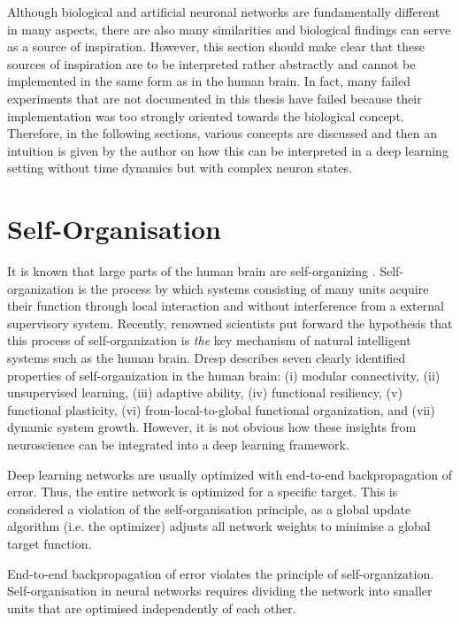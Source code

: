 Although biological and artificial neuronal networks are fundamentally different in many aspects, there are also many similarities and biological findings can serve as a source of inspiration. However, this section should make clear that these sources of inspiration are to be interpreted rather abstractly and cannot be implemented in the same form as in the human brain. In fact, many failed experiments that are not documented in this thesis have failed because their implementation was too strongly oriented towards the biological concept. Therefore, in the following sections, various concepts are discussed and then an intuition is given by the author on how this can be interpreted in a deep learning setting without time dynamics but with complex neuron states.


\section{Self-Organisation}
It is known that large parts of the human brain are self-organizing .
Self-organization is the process by which systems consisting of many units acquire their function through local interaction and without interference from a external supervisory system.
Recently, renowned scientists  put forward the hypothesis that this process of self-organization is \emph{the} key mechanism of natural intelligent systems such as the human brain.
Dresp  describes seven clearly identified properties of self-organization in the human brain: (i) modular connectivity, (ii) unsupervised learning, (iii) adaptive ability, (iv) functional resiliency, (v) functional plasticity, (vi) from-local-to-global functional organization, and (vii) dynamic system growth.
However, it is not obvious how these insights from neuroscience can be integrated into a deep learning framework.

Deep learning networks are usually optimized with end-to-end backpropagation of error.
Thus, the entire network is optimized for a specific target.
This is considered a violation of the self-organisation principle, as a global update algorithm (i.e. the optimizer) adjusts all network weights to minimise a global target function.


\begin{claim}
	End-to-end backpropagation of error violates the principle of self-organization. Self-organisation in neural networks requires dividing the network into smaller units that are optimised independently of each other.
\end{claim}

